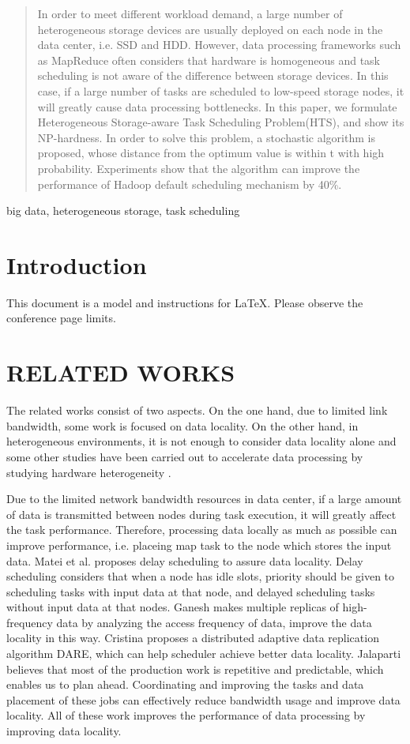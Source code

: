 \documentclass[conference]{IEEEtran}
\begin{document}
\begin{abstract}
In order to meet different workload demand, a large number of heterogeneous storage devices are usually deployed on each node in the data center, i.e. SSD and HDD. However, data processing frameworks such as MapReduce often considers that hardware is homogeneous and task scheduling is not aware of the difference between storage devices. In this case, if a large number of tasks are scheduled to low-speed storage nodes, it will greatly cause data processing bottlenecks. In this paper, we formulate Heterogeneous Storage-aware Task Scheduling Problem(HTS), and show its NP-hardness. In order to solve this problem, a stochastic algorithm is proposed, whose distance from the optimum value is within t with high probability. Experiments show that the algorithm can improve the performance of Hadoop default scheduling mechanism by 40\%.
\end{abstract}

\begin{IEEEkeywords}
big data, heterogeneous storage, task scheduling
\end{IEEEkeywords}

\section{Introduction}
This document is a model and instructions for \LaTeX.
Please observe the conference page limits. 

\section{RELATED WORKS}
The related works consist of two aspects. On the one hand, due to limited link bandwidth, some work is focused on data locality. On the other hand, in heterogeneous environments, it is not enough to consider data locality alone and some other studies have been carried out to accelerate data processing by studying hardware heterogeneity \cite{b1}.

Due to the limited network bandwidth resources in data center, if a large amount of data is transmitted between nodes during task execution, it will greatly affect the task performance. Therefore, processing data locally as much as possible can improve performance, i.e. placeing map task to the node which stores the input data. Matei et al. \cite{b2} proposes delay scheduling to assure data locality. Delay scheduling considers that when a node has idle slots, priority should be given to scheduling tasks with input data at that node, and delayed scheduling tasks without input data at that nodes. Ganesh \cite{b3} makes multiple replicas of high-frequency data by analyzing the access frequency of data, improve the data locality in this way. Cristina \cite{b4} proposes a distributed adaptive data replication algorithm DARE, which can help scheduler achieve better data locality. Jalaparti \cite{b5} believes that most of the production work is repetitive and predictable, which enables us to plan ahead. Coordinating and improving the tasks and data placement of these jobs can effectively reduce bandwidth usage and improve data locality. All of these work improves the performance of data processing by improving data locality.
\end{document}
